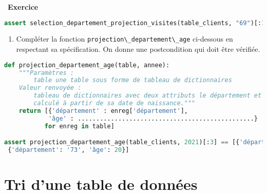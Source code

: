 \documentclass[
  11pt,
]{article}
\newcommand{\passthrough}[1]{#1}
\providecommand{\tightlist}{%
  \setlength{\itemsep}{0pt}\setlength{\parskip}{0pt}}
\newcounter{exo}
\newenvironment{exercice}[1]
{\par \medskip   \addtocounter{exo}{1} \noindent  
\begin{bclogo}[arrondi =0.1,   noborder = true, logo=\bccrayon, marge=4]{~\textbf{Exercice} \textbf{\theexo} {\itshape #1} }  \par}
{
\end{bclogo}
 \par \bigskip }
\newcounter{def}
\begin{document}
\begin{exercice}{}
\begin{lstlisting}[language=Python]
assert selection_departement_projection_visites(table_clients, "69")[:10] == [43, 52, 127, 53, 41, 117, 31, 86, 107, 145]
\end{lstlisting}

\begin{enumerate}
\def\labelenumi{\arabic{enumi}.}
\setcounter{enumi}{2}
\tightlist
\item
  Compléter la fonction
  \passthrough{\lstinline!projection\_departement\_age!} ci-dessous en
  respectant sa spécification. On donne une postcondition qui doit être
  vérifiée.
\end{enumerate}

\begin{lstlisting}[language=Python]
def projection_departement_age(table, annee):
    """Paramètres : 
        table une table sous forme de tableau de dictionnaires
    Valeur renvoyée :
        tableau de dictionnaires avec deux attributs le département et l'âge du client
        calculé à partir de sa date de naissance."""
    return [{'département' : enreg['département'], 
            'âge' : ................................................} 
           for enreg in table]

assert projection_departement_age(table_clients, 2021)[:3] == [{'département': '79', 'âge': 61}, {'département': '10', 'âge': 27},
 {'département': '73', 'âge': 20}]
\end{lstlisting}

\end{exercice}

\hypertarget{tri-dune-table-de-donnuxe9es}{%
\section{Tri d'une table de
données}\label{tri-dune-table-de-donnuxe9es}}
\end{document}
